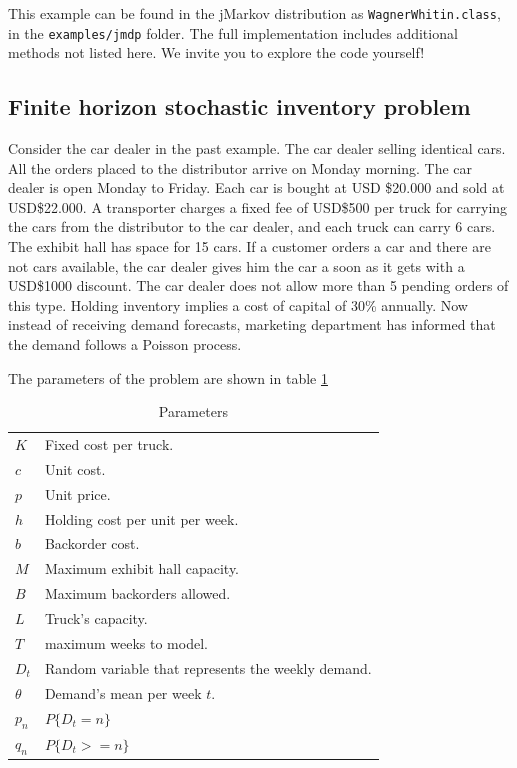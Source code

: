 \documentclass[11pt]{article}
\begin{document}
This example can be found in the jMarkov distribution as \lstinline!WagnerWhitin.class!, in the \lstinline!examples/jmdp! folder. The full implementation includes additional methods not listed here. We invite you to explore the code yourself!

\subsection{Finite horizon stochastic inventory problem}

Consider the car dealer in the past example. The car dealer selling identical cars. All the orders placed to the distributor arrive on Monday morning. The car dealer is open Monday to Friday. Each car is bought at USD \$20.000 and sold at USD\$22.000. A transporter charges a fixed fee of USD\$500 per truck for carrying the cars from the distributor to the car dealer, and each truck can carry 6 cars. The exhibit hall has space for 15 cars. If a customer orders a car and there are not cars available, the car dealer gives him the car a soon as it gets with a USD\$1000 discount. The car dealer does not allow more than 5 pending orders of this type. Holding inventory implies a cost of capital of 30\% annually. Now instead of receiving demand forecasts, marketing department has informed that the demand follows a Poisson process.

The parameters of the problem are shown in table \ref{tab:parameters2}

\begin{table}[ht]
\begin{center}
\begin{tabular}{ll}
$K$ & Fixed cost per truck.\\
$c$ & Unit cost.\\
$p$ & Unit price.\\
$h$ & Holding cost per unit per week.\\
$b$ & Backorder cost.\\
$M$ & Maximum exhibit hall capacity.\\
$B$ & Maximum backorders allowed.\\
$L$ & Truck's capacity.\\
$T$ & maximum weeks to model.\\
$D_t$ & Random variable that represents the weekly demand.\\
$\theta$ & Demand's mean per week $t$.\\
$p_n$ & $P\{D_t = n\}$\\
$q_n$ & $P\{D_t >= n\}$
\end{tabular}
\caption[\textbf{Parameters:}]{Parameters}
\label{tab:parameters2}
\end{center}
\end{table}
\end{document}
